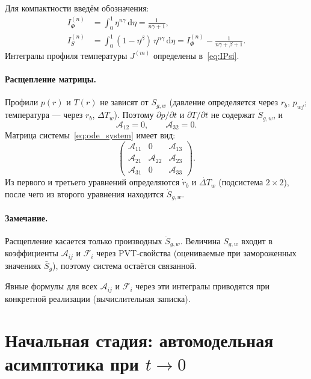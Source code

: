 \documentclass[12pt,a4paper]{article}
\newcommand{\dd}{\mathrm{d}}
\newcommand{\pp}{\partial}
\begin{document}
Для компактности введём обозначения:
\begin{align}
  I_\Phi^{(n)} &= \int_0^1 \eta^{n\gamma}\,\dd\eta
    = \frac{1}{n\gamma + 1}, \label{eq:IPhi} \\
  I_S^{(n)} &= \int_0^1 (1-\eta^\beta)\,\eta^{n\gamma}\,\dd\eta
    = I_\Phi^{(n)} - \frac{1}{n\gamma + \beta + 1}.
    \label{eq:IS}
\end{align}
Интегралы профиля температуры $J^{(m)}$
определены в~\eqref{eq:IPsi}.

\paragraph{Расщепление матрицы.}
Профили $p(r)$ и $T(r)$ не зависят от $S_{g,w}$
(давление определяется через $r_b$, $p_{wf}$;
температура --- через $r_b$, $\Delta T_w$).
Поэтому $\pp p/\pp t$ и $\pp T/\pp t$ не содержат
$\dot{S}_{g,w}$, и
\begin{equation}\label{eq:matrix_structure}
  \mathcal{A}_{12} = 0, \qquad \mathcal{A}_{32} = 0.
\end{equation}
Матрица системы~\eqref{eq:ode_system} имеет вид:
\[
  \begin{pmatrix}
    \mathcal{A}_{11} & 0 & \mathcal{A}_{13} \\
    \mathcal{A}_{21} & \mathcal{A}_{22} & \mathcal{A}_{23} \\
    \mathcal{A}_{31} & 0 & \mathcal{A}_{33}
  \end{pmatrix}.
\]
Из первого и третьего уравнений определяются $\dot{r}_b$
и $\dot{\Delta T}_w$ (подсистема $2\times 2$), после чего
из второго уравнения находится $\dot{S}_{g,w}$.

\paragraph{Замечание.}
Расщепление касается только производных $\dot{S}_{g,w}$.
Величина $S_{g,w}$ входит в коэффициенты $\mathcal{A}_{ij}$
и $\mathcal{F}_i$ через PVT-свойства (оцениваемые
при замороженных значениях $\bar{S}_g$), поэтому
система остаётся связанной.

Явные формулы для всех $\mathcal{A}_{ij}$ и $\mathcal{F}_i$
через эти интегралы приводятся при конкретной реализации
(вычислительная записка).


\section{Начальная стадия: автомодельная асимптотика при $t \to 0$}
\label{sec:initial_stage}
\end{document}
